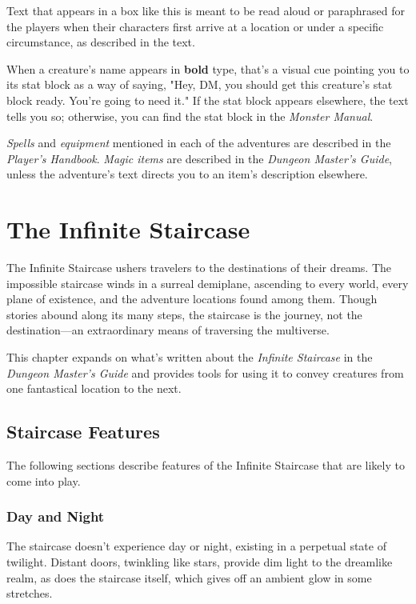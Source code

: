 \documentclass[10pt,a4paper,twoside,bg=print,twocolumn,openany,nodeprecatedcode]{dndbook}
\begin{document}
\begin{DndReadAloud}{}
Text that appears in a box like this is meant to be read aloud or paraphrased for the players when their characters first arrive at a location or under a specific circumstance, as described in the text.

\end{DndReadAloud}

When a creature's name appears in \textbf{bold} type, that's a visual cue pointing you to its stat block as a way of saying, "Hey, DM, you should get this creature's stat block ready. You're going to need it." If the stat block appears elsewhere, the text tells you so; otherwise, you can find the stat block in the \textit{Monster Manual}.

\textit{Spells} and \textit{equipment} mentioned in each of the adventures are described in the \textit{Player's Handbook}. \textit{Magic items} are described in the \textit{Dungeon Master's Guide}, unless the adventure's text directs you to an item's description elsewhere.

\chapter{The Infinite Staircase}
The Infinite Staircase ushers travelers to the destinations of their dreams. The impossible staircase winds in a surreal demiplane, ascending to every world, every plane of existence, and the adventure locations found among them. Though stories abound along its many steps, the staircase is the journey, not the destination—an extraordinary means of traversing the multiverse.

This chapter expands on what's written about the \textit{Infinite Staircase} in the \textit{Dungeon Master's Guide} and provides tools for using it to convey creatures from one fantastical location to the next.

\section{Staircase Features}
The following sections describe features of the Infinite Staircase that are likely to come into play.

\subsection{Day and Night}
The staircase doesn't experience day or night, existing in a perpetual state of twilight. Distant doors, twinkling like stars, provide dim light to the dreamlike realm, as does the staircase itself, which gives off an ambient glow in some stretches.
\end{document}
